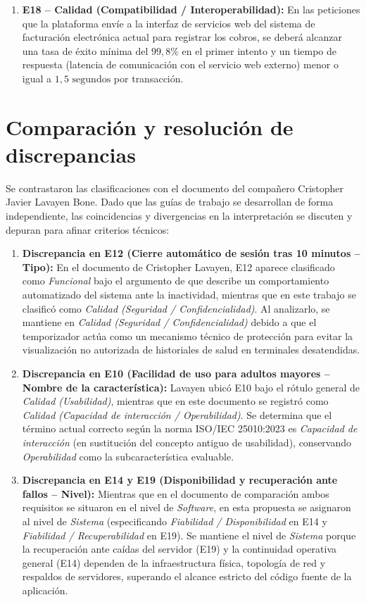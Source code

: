 \documentclass[10pt,a4paper]{article}
\begin{document}
\begin{enumerate}
    \item \textbf{E18 -- Calidad (Compatibilidad / Interoperabilidad):}
    En las peticiones que la plataforma env\'ie a la interfaz de servicios web del sistema de facturaci\'on electr\'onica actual para registrar los cobros, se deber\'a alcanzar una tasa de \'exito m\'inima del $99{,}8\%$ en el primer intento y un tiempo de respuesta (latencia de comunicaci\'on con el servicio web externo) menor o igual a $1{,}5\text{ segundos}$ por transacci\'on.
\end{enumerate}

\section{Comparaci\'on y resoluci\'on de discrepancias}
Se contrastaron las clasificaciones con el documento del compa\~nero Cristopher Javier Lavayen Bone. Dado que las gu\'ias de trabajo se desarrollan de forma independiente, las coincidencias y divergencias en la interpretaci\'on se discuten y depuran para afinar criterios t\'ecnicos:

\begin{enumerate}
    \item \textbf{Discrepancia en E12 (Cierre autom\'atico de sesi\'on tras 10 minutos -- Tipo):}
    En el documento de Cristopher Lavayen, E12 aparece clasificado como \textit{Funcional} bajo el argumento de que describe un comportamiento automatizado del sistema ante la inactividad, mientras que en este trabajo se clasific\'o como \textit{Calidad (Seguridad / Confidencialidad)}. Al analizarlo, se mantiene en \textit{Calidad (Seguridad / Confidencialidad)} debido a que el temporizador act\'ua como un mecanismo t\'ecnico de protecci\'on para evitar la visualizaci\'on no autorizada de historiales de salud en terminales desatendidas.

    \item \textbf{Discrepancia en E10 (Facilidad de uso para adultos mayores -- Nombre de la caracter\'istica):}
    Lavayen ubic\'o E10 bajo el r\'otulo general de \textit{Calidad (Usabilidad)}, mientras que en este documento se registr\'o como \textit{Calidad (Capacidad de interacci\'on / Operabilidad)}. Se determina que el t\'ermino actual correcto seg\'un la norma ISO/IEC 25010:2023 es \textit{Capacidad de interacci\'on} (en sustituci\'on del concepto antiguo de usabilidad), conservando \textit{Operabilidad} como la subcaracter\'istica evaluable.

    \item \textbf{Discrepancia en E14 y E19 (Disponibilidad y recuperaci\'on ante fallos -- Nivel):}
    Mientras que en el documento de comparaci\'on ambos requisitos se situaron en el nivel de \textit{Software}, en esta propuesta se asignaron al nivel de \textit{Sistema} (especificando \textit{Fiabilidad / Disponibilidad} en E14 y \textit{Fiabilidad / Recuperabilidad} en E19). Se mantiene el nivel de \textit{Sistema} porque la recuperaci\'on ante ca\'idas del servidor (E19) y la continuidad operativa general (E14) dependen de la infraestructura f\'isica, topolog\'ia de red y respaldos de servidores, superando el alcance estricto del c\'odigo fuente de la aplicaci\'on.
\end{enumerate}
\end{document}
